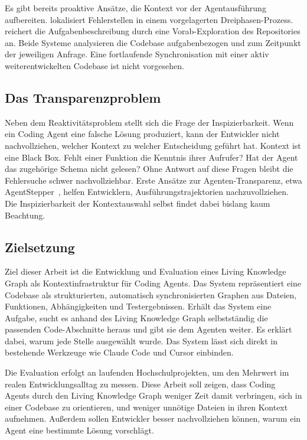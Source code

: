 Es gibt bereits proaktive Ansätze, die Kontext vor der Agentausführung aufbereiten.
\textcite{xia2024agentless} lokalisiert Fehlerstellen in einem vorgelagerten Dreiphasen-Prozess.
\textcite{suri2026codescout} reichert die Aufgabenbeschreibung
durch eine Vorab-Exploration des Repositories an.
Beide Systeme analysieren die Codebase aufgabenbezogen
und zum Zeitpunkt der jeweiligen Anfrage.
Eine fortlaufende Synchronisation mit einer aktiv weiterentwickelten Codebase
ist nicht vorgesehen.

\subsection*{Das Transparenzproblem}

Neben dem Reaktivitätsproblem stellt sich die Frage der Inspizierbarkeit.
Wenn ein Coding Agent eine falsche Lösung produziert,
kann der Entwickler nicht nachvollziehen,
welcher Kontext zu welcher Entscheidung geführt hat.
Kontext ist eine Black Box.
Fehlt einer Funktion die Kenntnis ihrer Aufrufer?
Hat der Agent das zugehörige Schema nicht gelesen?
Ohne Antwort auf diese Fragen bleibt die Fehlersuche schwer nachvollziehbar.
Erste Ansätze zur Agenten-Transparenz, etwa AgentStepper~\parencite{agentstepper2026},
helfen Entwicklern, Ausführungstrajektorien nachzuvollziehen.
Die Inspizierbarkeit der Kontextauswahl selbst
findet dabei bislang kaum Beachtung.

\subsection*{Zielsetzung}

Ziel dieser Arbeit ist die Entwicklung und Evaluation eines Living Knowledge Graph
als Kontextinfrastruktur für Coding Agents.
Das System repräsentiert eine Codebase als strukturierten,
automatisch synchronisierten Graphen aus Dateien, Funktionen, Abhängigkeiten
und Testergebnissen.
Erhält das System eine Aufgabe, sucht es anhand des Living Knowledge Graph selbstständig die passenden Code-Abschnitte heraus
und gibt sie dem Agenten weiter.
Es erklärt dabei, warum jede Stelle ausgewählt wurde.
Das System lässt sich direkt in bestehende Werkzeuge wie Claude Code und Cursor einbinden.

Die Evaluation erfolgt an laufenden Hochschulprojekten,
um den Mehrwert im realen Entwicklungsalltag zu messen.
Diese Arbeit soll zeigen, dass Coding Agents durch den Living Knowledge Graph
weniger Zeit damit verbringen, sich in einer Codebase zu orientieren,
und weniger unnötige Dateien in ihren Kontext aufnehmen.
Außerdem sollen Entwickler besser nachvollziehen können,
warum ein Agent eine bestimmte Lösung vorschlägt.
